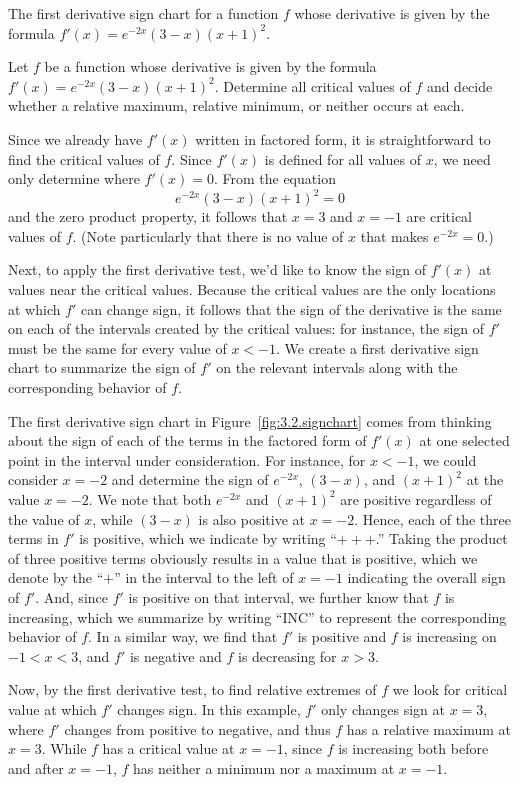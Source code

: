 \begin{marginfigure}[8cm]
\caption{The first derivative sign chart for a function $f$ whose derivative is given by the formula $f'(x) = e^{-2x}(3-x)(x+1)^2$.} \label{fig:3.2.signchart}
\end{marginfigure}

\begin{example} \label{Ex:3.2.Eg1}
Let $f$ be a function whose derivative is given by the formula $f'(x) = e^{-2x}(3-x)(x+1)^2$.  Determine all critical values of $f$ and decide whether a relative maximum, relative minimum, or neither occurs at each.

\solution Since we already have $f'(x)$ written in factored form, it is straightforward to find the critical values  of $f$.  Since $f'(x)$ is defined for all values of $x$, we need only determine where $f'(x) = 0$.  From the equation
$$e^{-2x}(3-x)(x+1)^2 = 0$$
and the zero product property, it follows that $x = 3$ and $x = -1$ are critical values of $f$.  (Note particularly that there is no value of $x$ that makes $e^{-2x} = 0$.)  

Next, to apply the first derivative test, we'd like to know the sign of $f'(x)$ at values near the critical values.  Because the critical values are the only locations at which $f'$ can change sign, it follows that the sign of the derivative is the same on each of the intervals created by the critical values:  for instance, the sign of $f'$ must be the same for every value of $x < -1$.  We create a first derivative sign chart to summarize the sign of $f'$ on the relevant intervals along with the corresponding behavior of $f$.

The first derivative sign chart in Figure~\ref{fig:3.2.signchart} comes from thinking about the sign of each of the terms in the factored form of $f'(x)$ at one selected point in the interval under consideration.  For instance, for $x < -1$, we could consider $x = -2$ and determine the sign of $e^{-2x}$, $(3-x)$, and $(x+1)^2$ at the value $x = -2$.  We note that both $e^{-2x}$ and $(x+1)^2$ are positive regardless of the value of $x$, while $(3-x)$ is also positive at $x = -2$.  Hence, each of the three terms in $f'$ is positive, which we indicate by writing ``$+++$.''  Taking the product of three positive terms obviously results in a value that is positive, which we denote by the ``$+$'' in the interval to the left of $x = -1$ indicating the overall sign of $f'$.  And, since $f'$ is positive on that interval, we further know that $f$ is increasing, which we summarize by writing ``INC'' to represent the corresponding behavior of $f$.  In a similar way, we find that $f'$ is positive and $f$ is increasing on $-1 < x < 3$, and $f'$ is negative and $f$ is decreasing for $x > 3$.

Now, by the first derivative test, to find relative extremes of $f$ we look for critical value at which $f'$ changes sign.  In this example, $f'$ only changes sign at $x = 3$, where $f'$ changes from positive to negative, and thus $f$ has a relative maximum at $x = 3$.  While $f$ has a critical value at $x = -1$, since $f$ is increasing both before and after $x = -1$, $f$ has neither a minimum nor a maximum at $x = -1$.
\end{example}
